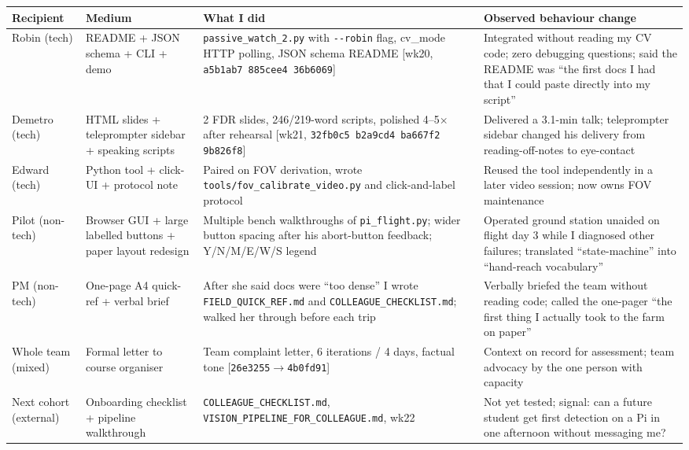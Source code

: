 {\footnotesize
\begin{tabularx}{\textwidth}{@{}p{1.7cm} p{3.0cm} X p{3.3cm}@{}}
\toprule
\textbf{Recipient} & \textbf{Medium} & \textbf{What I did} & \textbf{Observed behaviour change} \\
\midrule
Robin (tech) & README + JSON schema + CLI + demo & \texttt{passive\_watch\_2.py} with \texttt{-{}-robin} flag, cv\_mode HTTP polling, JSON schema README \cite{robinhandoff} [wk20, \texttt{a5b1ab7 885cee4 36b6069}] & Integrated without reading my CV code; zero debugging questions; said the README was ``the first docs I had that I could paste directly into my script'' \\
Demetro (tech) & HTML slides + teleprompter sidebar + speaking scripts & 2 FDR slides, 246/219-word scripts, polished 4--5$\times$ after rehearsal [wk21, \texttt{32fb0c5 b2a9cd4 ba667f2 9b826f8}] & Delivered a 3.1-min talk; teleprompter sidebar changed his delivery from reading-off-notes to eye-contact \\
Edward (tech) & Python tool + click-UI + protocol note & Paired on FOV derivation, wrote \texttt{tools/fov\_calibrate\_video.py} and click-and-label protocol & Reused the tool independently in a later video session; now owns FOV maintenance \\
Pilot (non-tech) & Browser GUI + large labelled buttons + paper layout redesign & Multiple bench walkthroughs of \texttt{pi\_flight.py}; wider button spacing after his abort-button feedback; Y/N/M/E/W/S legend & Operated ground station unaided on flight day 3 while I diagnosed other failures; translated ``state-machine'' into ``hand-reach vocabulary'' \\
PM (non-tech) & One-page A4 quick-ref + verbal brief & After she said docs were ``too dense'' I wrote \texttt{FIELD\_QUICK\_REF.md} and \texttt{COLLEAGUE\_CHECKLIST.md}; walked her through before each trip & Verbally briefed the team without reading code; called the one-pager ``the first thing I actually took to the farm on paper'' \\
Whole team (mixed) & Formal letter to course organiser & Team complaint letter, 6 iterations / 4 days, factual tone [\texttt{26e3255}$\to$\texttt{4b0fd91}] \cite{complaintletter} & Context on record for assessment; team advocacy by the one person with capacity \\
Next cohort (external) & Onboarding checklist + pipeline walkthrough & \texttt{COLLEAGUE\_CHECKLIST.md}, \texttt{VISION\_PIPELINE\_FOR\_COLLEAGUE.md}, wk22 & Not yet tested; signal: can a future student get first detection on a Pi in one afternoon without messaging me? \\
\bottomrule
\end{tabularx}}

